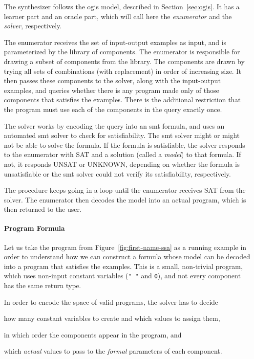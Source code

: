 The synthesizer follows the \gls{ogis} model, described in
Section~\ref{sec:ogis}.
It has a learner part and an oracle part, which will call here the
\textit{enumerator} and the \textit{solver}, respectively.

The enumerator receives the set of input-output examples as input, and is
parameterized by the library of components. The enumerator is responsible for
drawing a subset of components from the library. The components are drawn by
trying all sets of combinations (with replacement) in order of increasing size.
It then passes these components to the solver, along with the input-output
examples, and queries whether there is any program made only of those components
that satisfies the examples. There is the additional restriction that the
program must use each of the components in the query exactly once.

The solver works by encoding the query into an \gls{smt} formula, and uses an
automated \gls{smt} solver to check for satisfiability. The \gls{smt} solver
might or might not be able to solve the formula. If the formula is satisfiable,
the solver responds to the enumerator with SAT and a solution (called a
\textit{model}) to that formula. If not, it responds UNSAT or UNKNOWN, depending
on whether the formula is unsatisfiable or the \gls{smt} solver could not verify
its satisfiability, respectively.

The procedure keeps going in a loop until the enumerator receives SAT from the
solver. The enumerator then decodes the model into an actual program, which is
then returned to the user.

\paragraph{Program Formula}
\label{sec:program-formula}

Let us take the program from Figure~\ref{fig:first-name-ssa} as a running
example in order to understand how we can construct a formula whose model can be
decoded into a program that satisfies the examples. This is a small, non-trivial
program, which uses non-input constant variables (\lstinline{" "} and
\lstinline{0}), and not every component has the same return type.

In order to encode the space of valid programs, the solver has to decide
\begin{enumerate*}[(1)]
\item how many constant variables to create and which values to assign them,
\item in which order the components appear in the program, and
\item which \textit{actual} values to pass to the \textit{formal} parameters of
  each component.
\end{enumerate*}

